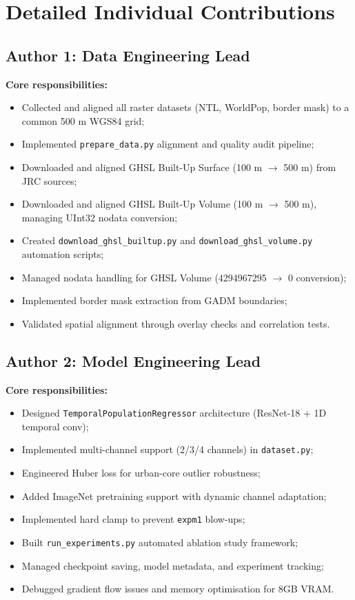 \documentclass[12pt,a4paper]{article}
\begin{document}
\newpage
\appendix
\section{Detailed Individual Contributions}
\label{app:contributions}

\subsection{Author 1: Data Engineering Lead}
\label{subsec:author1}

\textbf{Core responsibilities:}
\begin{itemize}
    \item Collected and aligned all raster datasets (NTL, WorldPop, border mask) to a common 500 m WGS84 grid;
    \item Implemented \texttt{prepare\_data.py} alignment and quality audit pipeline;
    \item Downloaded and aligned GHSL Built-Up Surface (100 m $\rightarrow$ 500 m) from JRC sources;
    \item Downloaded and aligned GHSL Built-Up Volume (100 m $\rightarrow$ 500 m), managing UInt32 nodata conversion;
    \item Created \texttt{download\_ghsl\_builtup.py} and \texttt{download\_ghsl\_volume.py} automation scripts;
    \item Managed nodata handling for GHSL Volume (4294967295 $\rightarrow$ 0 conversion);
    \item Implemented border mask extraction from GADM boundaries;
    \item Validated spatial alignment through overlay checks and correlation tests.
\end{itemize}

\subsection{Author 2: Model Engineering Lead}
\label{subsec:author2}

\textbf{Core responsibilities:}
\begin{itemize}
    \item Designed \texttt{TemporalPopulationRegressor} architecture (ResNet-18 + 1D temporal conv);
    \item Implemented multi-channel support (2/3/4 channels) in \texttt{dataset.py};
    \item Engineered Huber loss for urban-core outlier robustness;
    \item Added ImageNet pretraining support with dynamic channel adaptation;
    \item Implemented hard clamp to prevent \texttt{expm1} blow-ups;
    \item Built \texttt{run\_experiments.py} automated ablation study framework;
    \item Managed checkpoint saving, model metadata, and experiment tracking;
    \item Debugged gradient flow issues and memory optimisation for 8GB VRAM.
\end{itemize}
\end{document}
